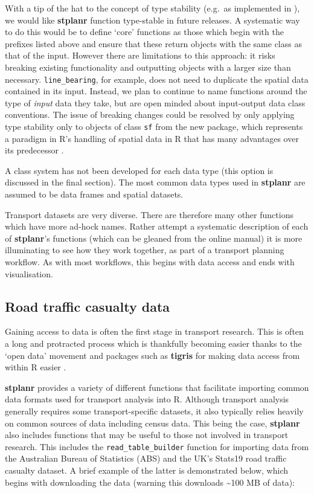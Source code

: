 With a tip of the hat to the concept of type stability (e.g.~as
implemented in ), we would like
\textbf{stplanr} function type-stable in future releases.
A systematic way to do this would be to define `core' functions
as those which begin with the prefixes listed above
and ensure that these return objects with the same class as
that of the input. However there are limitations to this approach: it
risks breaking existing functionality and outputting objects with a
larger size than necessary.
\texttt{line\_bearing}, for example, does
not need to duplicate the spatial data contained in its input.
Instead,
we plan to continue to name functions around the type of \emph{input}
data they take, but are open minded about input-output data
class conventions.
The issue of breaking changes could be resolved by only applying type stability
only to objects of class \texttt{sf} from  the new  package,
which represents a paradigm in R's handling of
spatial data in R that has many advantages over its predecessor .

A class system has not been developed for each data type (this option is
discussed in the final section). The most common data types used in
\textbf{stplanr} are assumed to be data frames and spatial datasets.

Transport datasets are very diverse. There are therefore many other
functions which have more ad-hock names. Rather attempt a systematic
description of each of \textbf{stplanr}'s functions (which can be
gleaned from the online manual) it is more illuminating to see how they
work together, as part of a transport planning workflow. As with most
workflows, this begins with data access and ends with visualisation.

\subsection{Road traffic casualty data}\label{accessing-and-processing-transport-data}

Gaining access to data is often the first stage in transport research.
This is often a long and protracted process which is thankfully becoming
easier thanks to the `open data' movement and packages such as
\textbf{tigris} for making data access from within R easier
\citep{walker_tigris:_2016}.

\textbf{stplanr} provides a variety of different functions that
facilitate importing common data formats used for transport analysis
into R. Although transport analysis generally requires some
transport-specific datasets, it also typically relies heavily on common
sources of data including census data. This being the case,
\textbf{stplanr} also includes functions that may be useful to those not
involved in transport research. This includes the
\texttt{read\_table\_builder} function for importing data from the
Australian Bureau of Statistics (ABS) and the UK's Stats19 road traffic
casualty dataset. A brief example of the latter is demonstrated below,
which begins with downloading the data (warning this downloads
\textasciitilde{}100 MB of data):

